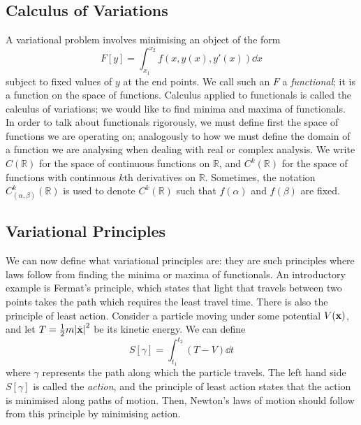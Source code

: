 \subsection{Calculus of Variations}
A variational problem involves minimising an object of the form
\[
	F[y] = \int_{x_1}^{x_2} f(x, y(x), y'(x)) \dd{x}
\]
subject to fixed values of \(y\) at the end points.
We call such an \(F\) a \textit{functional}; it is a function on the space of functions.
Calculus applied to functionals is called the calculus of variations; we would like to find minima and maxima of functionals.
In order to talk about functionals rigorously, we must define first the space of functions we are operating on; analogously to how we must define the domain of a function we are analysing when dealing with real or complex analysis.
We write \(C(\mathbb R)\) for the space of continuous functions on \(\mathbb R\), and \(C^k(\mathbb R)\) for the space of functions with continuous \(k\)th derivatives on \(\mathbb R\).
Sometimes, the notation \(C_{(\alpha, \beta)}^k(\mathbb R)\) is used to denote \(C^k(\mathbb R)\) such that \(f(\alpha)\) and \(f(\beta)\) are fixed.

\subsection{Variational Principles}
We can now define what variational principles are: they are such principles where laws follow from finding the minima or maxima of functionals.
An introductory example is Fermat's principle, which states that light that travels between two points takes the path which requires the least travel time.
There is also the principle of least action.
Consider a particle moving under some potential \(V(\vb x)\), and let \(T = \frac{1}{2}m\abs{\dot {\vb x}}^2\) be its kinetic energy.
We can define
\[
	S[\gamma] = \int_{t_1}^{t_2} (T - V)\dd{t}
\]
where \(\gamma\) represents the path along which the particle travels.
The left hand side \(S[\gamma]\) is called the \textit{action}, and the principle of least action states that the action is minimised along paths of motion.
Then, Newton's laws of motion should follow from this principle by minimising action.
